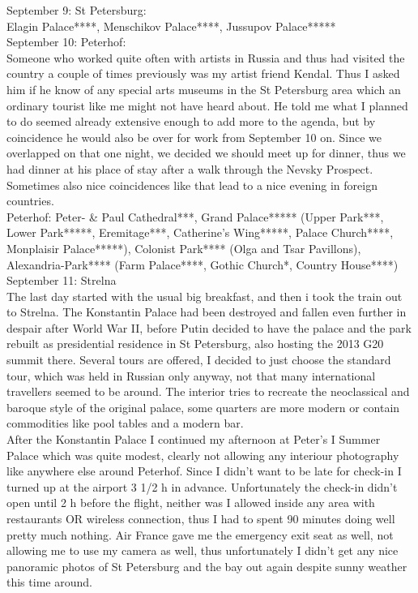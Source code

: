 September 9: St Petersburg:\\
Elagin Palace****, Menschikov Palace****, Jussupov Palace*****\\

September 10: Peterhof:\\

Someone who worked quite often with artists in Russia and thus had visited the country a couple of times previously was my artist friend Kendal. Thus I asked him if he know of any special arts museums in the St Petersburg area which an ordinary tourist like me might not have heard about. He told me what I planned to do seemed already extensive enough to add more to the agenda, but by coincidence he would also be over for work from September 10 on. Since we overlapped on that one night, we decided we should meet up for dinner, thus we had dinner at his place of stay after a walk through the Nevsky Prospect. Sometimes also nice coincidences like that lead to a nice evening in foreign countries.\\

Peterhof: Peter- \& Paul Cathedral***, Grand Palace***** (Upper Park***, Lower Park*****, Eremitage***, Catherine's Wing*****, Palace Church****, Monplaisir Palace*****), Colonist Park**** (Olga and Tsar Pavillons), Alexandria-Park**** (Farm Palace****, Gothic Church*, Country House****)\\

September 11: Strelna\\
The last day started with the usual big breakfast, and then i took the train out to Strelna. The Konstantin Palace had been destroyed and fallen even further in despair after World War II, before Putin decided to have the palace and the park rebuilt as presidential residence in St Petersburg, also hosting the 2013 G20 summit there. Several tours are offered, I decided to just choose the standard tour, which was held in Russian only anyway, not that many international travellers seemed to be around. The interior tries to recreate the neoclassical and baroque style of the original palace, some quarters are more modern or contain commodities like pool tables and a modern bar.\\
After the Konstantin Palace I continued my afternoon at Peter's I Summer Palace which was quite modest, clearly not allowing any interiour photography like anywhere else around Peterhof. Since I didn't want to be late for check-in I turned up at the airport 3 1/2 h in advance. Unfortunately the check-in didn't open until 2 h before the flight, neither was I allowed inside any area with restaurants OR wireless connection, thus I had to spent 90 minutes doing well pretty much nothing. Air France gave me the emergency exit seat as well, not allowing me to use my camera as well, thus unfortunately I didn't get any nice panoramic photos of St Petersburg and the bay out again despite sunny weather this time around.\\

